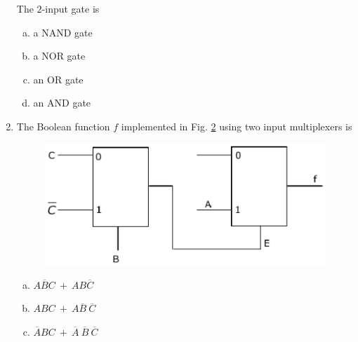 \documentclass[journal,12pt,twocolumn]{IEEEtran}
\begin{document}
\begin{enumerate}
\begin{figure}
\caption{}

\label{fig:23}

\end{figure} 




The $2$-input gate is 

\begin{enumerate}[(a)]
 
\item a NAND gate

\item a NOR gate

\item an OR gate

\item an AND gate

\end{enumerate}

\item The Boolean function $f$ implemented in Fig. \ref{fig:24} using two input multiplexers is 

\begin{figure}

\centering

\includegraphics[width=\columnwidth]{./figs/28.eps}

\caption{}

\label{fig:24}

\end{figure} 



\begin{enumerate}[(a)]
 
\item $ A\overline{B}C \ + \ AB\overline{C} $

\item $ ABC \ + \ A\overline{B} \ \overline{C} $

\item $ \overline{A}BC \ + \ \overline{A} \ \overline{B} \ \overline{C} $


\end{enumerate}
\end{enumerate}
\end{document}
